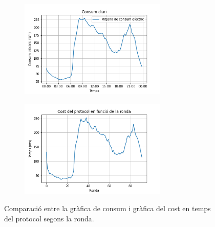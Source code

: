 \begin{figure}[H]
	
	\centering
	\begin{subfigure}[b]{0.48\textwidth}
		\centering
		\includegraphics[width=7cm]{imgs/cost/consumption.png}
	\end{subfigure}
	\begin{subfigure}[b]{0.48\textwidth}
		\centering
		\includegraphics[width=7cm]{imgs/cost/16compt-dataset.png}
	\end{subfigure}
	\caption{Comparació entre la gràfica de consum i gràfica del cost en temps del protocol segons la ronda.}
	\label{fig:cost-kaggle}
	\centering
\end{figure}
